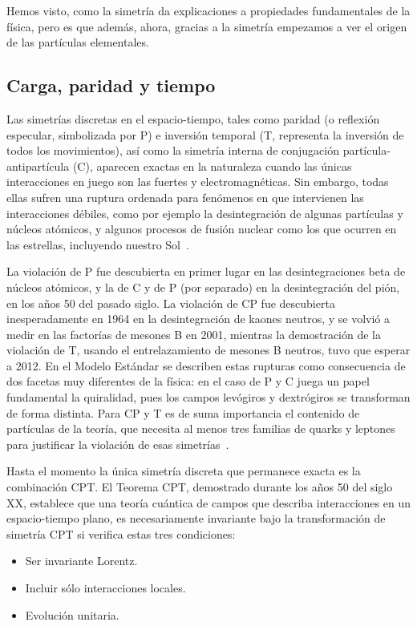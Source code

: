 Hemos visto, como la simetría da explicaciones a propiedades fundamentales de la física, pero es que además, ahora, gracias a la simetría empezamos a ver el origen de las partículas elementales.

\subsection{Carga, paridad y tiempo}\label{sec:paridad-carga-y-tiempo}

Las simetrías discretas en el espacio-tiempo, tales como paridad (o reflexión especular, simbolizada por P) e inversión temporal (T, representa la inversión de todos los movimientos), así como la simetría interna de conjugación partícula-antipartícula (C), aparecen exactas en la naturaleza cuando las únicas interacciones en juego son las fuertes y electromagnéticas. Sin embargo, todas ellas sufren una ruptura ordenada para fenómenos en que intervienen las interacciones débiles, como por ejemplo la desintegración de algunas partículas y núcleos atómicos, y algunos procesos de fusión nuclear como los que ocurren en las estrellas, incluyendo nuestro Sol~\autocite{IFIC}.

La violación de P fue descubierta en primer lugar en las desintegraciones beta de núcleos atómicos, y la de C y de P (por separado) en la desintegración del pión, en los años 50 del pasado siglo. La violación de CP fue descubierta inesperadamente en 1964 en la desintegración de kaones neutros, y se volvió a medir en las factorías de mesones B en 2001, mientras la demostración de la violación de T, usando el entrelazamiento de mesones B neutros, tuvo que esperar a 2012. En el Modelo Estándar se describen estas rupturas como consecuencia de dos facetas muy diferentes de la física: en el caso de P y C juega un papel fundamental la quiralidad, pues los campos levógiros y dextrógiros se transforman de forma distinta. Para CP y T es de suma importancia el contenido de partículas de la teoría, que necesita al menos tres familias de quarks y leptones para justificar la violación de esas simetrías~\autocite{IFIC}.

Hasta el momento la única simetría discreta que permanece exacta es la combinación CPT. El Teorema CPT, demostrado durante los años 50 del siglo XX, establece que una teoría cuántica de campos que describa interacciones en un espacio-tiempo plano, es necesariamente invariante bajo la transformación de simetría CPT si verifica estas tres condiciones:
\begin{itemize}
	\item Ser invariante Lorentz.
	\item Incluir sólo interacciones locales.
	\item Evolución unitaria.
\end{itemize}
~\autocite{IFIC}

